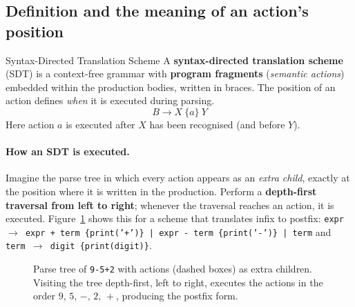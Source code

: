 \documentclass[11pt,a4paper]{article}
\begin{document}
\subsection{Definition and the meaning of an action's position}
\begin{defbox}{Syntax-Directed Translation Scheme}
A \textbf{syntax-directed translation scheme} (SDT) is a context-free grammar with \textbf{program fragments} (\emph{semantic actions}) embedded within the production bodies, written in braces. The position of an action defines \emph{when} it is executed during parsing.
\[
B \to X\ \{a\}\ Y
\]
Here action $a$ is executed after $X$ has been recognised (and before $Y$).
\end{defbox}

\paragraph{How an SDT is executed.} Imagine the parse tree in which every action appears as an \emph{extra child}, exactly at the position where it is written in the production. Perform a \textbf{depth-first traversal from left to right}; whenever the traversal reaches an action, it is executed. Figure~\ref{fig:actiontree} shows this for a scheme that translates infix to postfix: \texttt{expr $\to$ expr + term \{print('+')\}\ |\ expr - term \{print('-')\}\ |\ term} and \texttt{term $\to$ digit \{print(digit)\}}.

\begin{figure}[htbp]
\centering
{}
\caption{Parse tree of \texttt{9-5+2} with actions (dashed boxes) as extra children. Visiting the tree depth-first, left to right, executes the actions in the order $9,\,5,\,-,\,2,\,+$, producing the postfix form.}
\label{fig:actiontree}
\end{figure}
\end{document}
